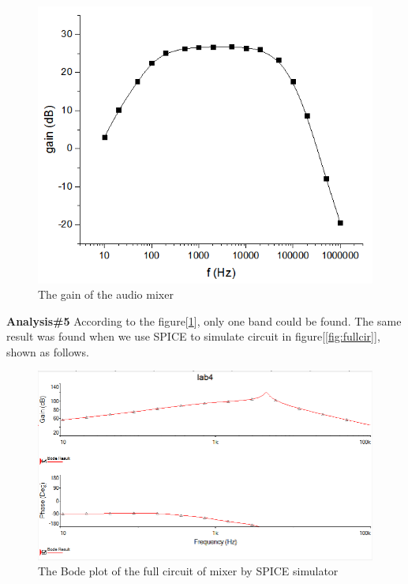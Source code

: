 \begin{figure}[!htbp]
	\centering
	\begin{framed}
		\includegraphics[width=\linewidth]{images/ana5.png}
		\caption{The gain of the audio mixer}
		\label{fig:mixerg}
	\end{framed}
\end{figure}

\hfill \newline
\textbf{Analysis\#5} \newline
According to the figure[\ref{fig:mixerg}], only one band could be found. The same result was found when we use SPICE to simulate circuit in figure[\ref{fig:fullcir}], shown as follows.

\begin{figure}
	\centering
	\begin{framed}
		\includegraphics[width=\linewidth]{images/bode_whole.png}
		\caption{The Bode plot of the full circuit of mixer by SPICE simulator}
		\label{fig:spice}
	\end{framed}
\end{figure}

